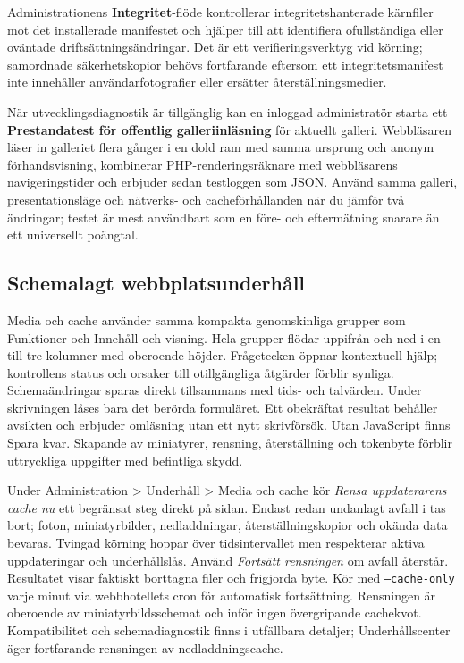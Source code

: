 \documentclass[11pt,a4paper]{article}
\newcommand{\filepath}[1]{\path{#1}}
\newcommand{\ui}[1]{\textbf{#1}}
\begin{document}
Administrationens \ui{Integritet}-flöde kontrollerar integritetshanterade
kärnfiler mot det installerade manifestet och hjälper till att identifiera
ofullständiga eller oväntade driftsättningsändringar. Det är ett
verifieringsverktyg vid körning; samordnade säkerhetskopior behövs fortfarande
eftersom ett integritetsmanifest inte innehåller användarfotografier eller
ersätter återställningsmedier.

När utvecklingsdiagnostik är tillgänglig kan en inloggad administratör starta
ett \ui{Prestandatest för offentlig galleriinläsning} för aktuellt galleri.
Webbläsaren läser in galleriet flera gånger i en dold ram med samma ursprung och
anonym förhandsvisning, kombinerar PHP-renderingsräknare med webbläsarens
navigeringstider och erbjuder sedan testloggen som JSON. Använd samma galleri,
presentationsläge och nätverks- och cacheförhållanden när du jämför två
ändringar; testet är mest användbart som en före- och eftermätning snarare än
ett universellt poängtal.

\subsection{Schemalagt webbplatsunderhåll}

Media och cache använder samma kompakta genomskinliga grupper som Funktioner
och Innehåll och visning. Hela grupper flödar uppifrån och ned i en till tre
kolumner med oberoende höjder. Frågetecken öppnar kontextuell hjälp; kontrollens
status och orsaker till otillgängliga åtgärder förblir synliga. Schemaändringar
sparas direkt tillsammans med tids- och talvärden. Under skrivningen låses
bara det berörda formuläret. Ett obekräftat resultat behåller avsikten och
erbjuder omläsning utan ett nytt skrivförsök. Utan JavaScript finns Spara kvar.
Skapande av miniatyrer, rensning, återställning och tokenbyte förblir
uttryckliga
uppgifter med befintliga skydd.

Under Administration > Underhåll > Media och cache kör \emph{Rensa uppdaterarens
cache nu} ett begränsat steg direkt på sidan. Endast redan undanlagt avfall i
\filepath{cache/updates/prune-trash} tas bort; foton, miniatyrbilder,
nedladdningar, återställningskopior och okända data bevaras. Tvingad körning
hoppar över tidsintervallet men respekterar aktiva uppdateringar och
underhållslås. Använd \emph{Fortsätt rensningen} om avfall återstår. Resultatet
visar faktiskt borttagna filer och frigjorda byte. Kör
\filepath{scripts/site_maintenance.php} med \texttt{--cache-only} varje minut
via webbhotellets cron för automatisk fortsättning. Rensningen är oberoende av
miniatyrbildsschemat och inför ingen övergripande cachekvot. Kompatibilitet och
schemadiagnostik finns i utfällbara detaljer; Underhållscenter äger fortfarande
rensningen av nedladdningscache.
\end{document}
